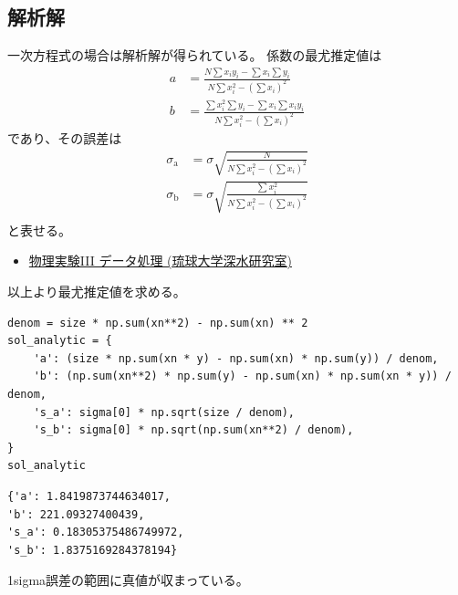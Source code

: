 \documentclass[a4paper, 9pt, notitlepage, uplatex, dvipdfmx]{jsarticle}
\begin{document}
\subsection{解析解}
\label{sec:org8e45a28}
一次方程式の場合は解析解が得られている。
係数の最尤推定値は
\begin{align}
\label{eq:1}
  a &= \frac{N\sum x_i y_i - \sum x_i \sum y_i}{N\sum x_i^2 - (\sum x_i)^2} \\
  b &= \frac{\sum x_i^2 \sum y_i - \sum x_i \sum x_i y_i}{N\sum x_i^2 - (\sum x_i)^2}
\end{align}
であり、その誤差は
\begin{align}
\label{eq:2}
  \sigma_\text{a} & = \sigma \sqrt{\frac{N}{N\sum x_i^2 - (\sum x_i)^2}} \\
  \sigma_\text{b} & = \sigma \sqrt{\frac{\sum x_i^2}{N\sum x_i^2 - (\sum x_i)^2}} \\
\end{align}
と表せる。
\begin{itemize}
\item \href{http://www.cc.u-ryukyu.ac.jp/\~fukami/p0.pdf}{物理実験III データ処理 (琉球大学深水研究室)}
\end{itemize}

以上より最尤推定値を求める。
\begin{verbatim}
denom = size * np.sum(xn**2) - np.sum(xn) ** 2
sol_analytic = {
    'a': (size * np.sum(xn * y) - np.sum(xn) * np.sum(y)) / denom,
    'b': (np.sum(xn**2) * np.sum(y) - np.sum(xn) * np.sum(xn * y)) / denom,
    's_a': sigma[0] * np.sqrt(size / denom),
    's_b': sigma[0] * np.sqrt(np.sum(xn**2) / denom),
}
sol_analytic
\end{verbatim}

\label{}
\begin{verbatim}
{'a': 1.8419873744634017,
'b': 221.09327400439,
's_a': 0.18305375486749972,
's_b': 1.8375169284378194}
\end{verbatim}

1sigma誤差の範囲に真値が収まっている。
\end{document}
